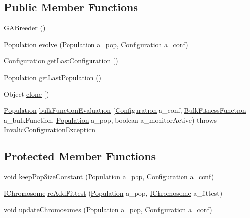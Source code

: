 \subsection*{Public Member Functions}
\begin{DoxyCompactItemize}
\item 
\hyperlink{classorg_1_1jgap_1_1impl_1_1_g_a_breeder_a03f1314e5b0fd71fc947da7710828b5a}{G\-A\-Breeder} ()
\item 
\hyperlink{classorg_1_1jgap_1_1_population}{Population} \hyperlink{classorg_1_1jgap_1_1impl_1_1_g_a_breeder_a2714ceb0e7ce43593588c15dd0c7463e}{evolve} (\hyperlink{classorg_1_1jgap_1_1_population}{Population} a\-\_\-pop, \hyperlink{classorg_1_1jgap_1_1_configuration}{Configuration} a\-\_\-conf)
\item 
\hyperlink{classorg_1_1jgap_1_1_configuration}{Configuration} \hyperlink{classorg_1_1jgap_1_1impl_1_1_g_a_breeder_a31f4144b00e3f5f5f8e9fbc4546e9ed1}{get\-Last\-Configuration} ()
\item 
\hyperlink{classorg_1_1jgap_1_1_population}{Population} \hyperlink{classorg_1_1jgap_1_1impl_1_1_g_a_breeder_a66262968a84ce4b0eb8ec5bf1bb11b77}{get\-Last\-Population} ()
\item 
Object \hyperlink{classorg_1_1jgap_1_1impl_1_1_g_a_breeder_ae1a85544ed35077e1ef35eee71769b84}{clone} ()
\item 
\hyperlink{classorg_1_1jgap_1_1_population}{Population} \hyperlink{classorg_1_1jgap_1_1impl_1_1_g_a_breeder_ae2fbd377bce110b40fd5f1190f172b7e}{bulk\-Function\-Evaluation} (\hyperlink{classorg_1_1jgap_1_1_configuration}{Configuration} a\-\_\-conf, \hyperlink{classorg_1_1jgap_1_1_bulk_fitness_function}{Bulk\-Fitness\-Function} a\-\_\-bulk\-Function, \hyperlink{classorg_1_1jgap_1_1_population}{Population} a\-\_\-pop, boolean a\-\_\-monitor\-Active)  throws Invalid\-Configuration\-Exception 
\end{DoxyCompactItemize}
\subsection*{Protected Member Functions}
\begin{DoxyCompactItemize}
\item 
void \hyperlink{classorg_1_1jgap_1_1impl_1_1_g_a_breeder_a471a98d00f64bc7928685bae5c7b2ea5}{keep\-Pop\-Size\-Constant} (\hyperlink{classorg_1_1jgap_1_1_population}{Population} a\-\_\-pop, \hyperlink{classorg_1_1jgap_1_1_configuration}{Configuration} a\-\_\-conf)
\item 
\hyperlink{interfaceorg_1_1jgap_1_1_i_chromosome}{I\-Chromosome} \hyperlink{classorg_1_1jgap_1_1impl_1_1_g_a_breeder_ae5a6f2395851cc67332e2965989d87df}{re\-Add\-Fittest} (\hyperlink{classorg_1_1jgap_1_1_population}{Population} a\-\_\-pop, \hyperlink{interfaceorg_1_1jgap_1_1_i_chromosome}{I\-Chromosome} a\-\_\-fittest)
\item 
void \hyperlink{classorg_1_1jgap_1_1impl_1_1_g_a_breeder_aee884911196f1d59ed0fcb43e718f551}{update\-Chromosomes} (\hyperlink{classorg_1_1jgap_1_1_population}{Population} a\-\_\-pop, \hyperlink{classorg_1_1jgap_1_1_configuration}{Configuration} a\-\_\-conf)
\end{DoxyCompactItemize}
